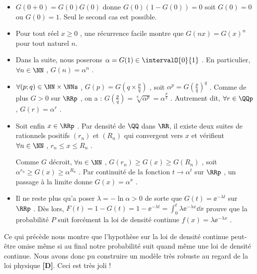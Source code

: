 \begin{itemize}[label=\small\textbullet]
	\item $G(0 + 0) = G(0) G(0)$ donne $G(0)(1 - G(0)) = 0$ soit $G(0) = 0$ ou $G(0) = 1$. Seul le second cas est possible.

	


	\medskip
	\item Pour tout réel $x \geq 0$ , une récurrence facile montre que $G(nx) = G(x)^n$ pour tout naturel $n$.

	


	\medskip
	\item Dans la suite, nous poserons $\alpha = G(1) \in \intervalO{0}{1}$ .
	En particulier, $\forall n \in \NN$ , $G(n) = \alpha^n$ .

	


	\medskip
	\item $\forall (p ; q) \in \NN \times \NNs$ , $G(p) = G \left( q \times \frac{p}{q} \right)$ , soit $\alpha^p = G \left( \frac{p}{q} \right)^q$ .
	Comme de plus $G > 0$ sur $\RRp$ , on a : $G \left( \frac{p}{q} \right) = \sqrt[q\,\,]{\alpha^p} = \alpha^{\frac{p}{q}}$ .
	Autrement dit, $\forall r \in \QQp$ , $G(r) = \alpha^r$ .

	


	\medskip
	\item Soit enfin $x \in \RRp$ . Par densité de $\QQ$ dans $\RR$, il existe deux suites de rationnels positifs $(r_n)$ et $(R_n)$ qui convergent vers $x$ et vérifient $\forall n \in \NN$ , $r_n \leq x \leq R_n$ .
	
	\smallskip\noindent
	Comme $G$ décroit, $\forall n \in \NN$ , $G(r_n) \geq G(x) \geq G(R_n)$ , soit $\alpha^{r_n} \geq G(x) \geq \alpha^{R_n}$ .
	Par continuité de la fonction $t \rightarrow \alpha^t$ sur $\RRp$ , un passage à la limite donne $G(x) = \alpha^x$ .

	


	\medskip
	\item Il ne reste plus qu'a poser $\lambda = - \ln \alpha > 0$ de sorte que $G(t) = \ee^{- \lambda t}$ sur $\RRp$ .
	Dès lors, $\displaystyle F(t) = 1 - G(t) = 1 - \ee^{- \lambda t} = \int_0^t \lambda \ee^{-\lambda x} \dd{x}$ prouve que la probabilité $P$ suit forcément la loi de densité continue $f(x) = \lambda \ee^{-\lambda x}$ .
\end{itemize}

	


\medskip


Ce qui précède nous montre que l'hypothèse sur la loi de densité continue peut-être omise même si au final notre probabilité suit quand même une loi de densité continue. Nous avons donc pu construire un modèle très robuste au regard de la loi physique \textbf{[D]}. Ceci est très joli !